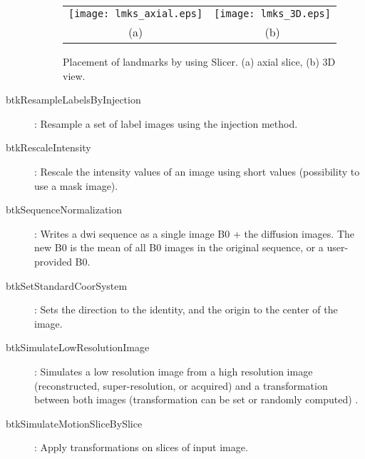 \begin{description}
\begin{figure}[t]
\centering
\begin{tabular}{cc}
\texttt{[image: lmks\_axial.eps]}&
\texttt{[image: lmks\_3D.eps]}\\
{(a)}&{(b)}\\
\end{tabular}
\caption{Placement of landmarks by using Slicer. (a) axial slice, (b) 3D view.}
\label{fig:landmarks}
\end{figure}

\item[btkResampleLabelsByInjection]: Resample a set of label images using the injection method.
\item[btkRescaleIntensity]: Rescale the intensity values of an image using short values (possibility to use a mask image).
\item[btkSequenceNormalization]: Writes a dwi sequence as a single image B0 + the diffusion images. The new B0 is the mean of all B0 images in the original sequence, or a user-provided B0.
\item[btkSetStandardCoorSystem]: Sets the direction to the identity, and the origin to the center of the image.
\item[btkSimulateLowResolutionImage]: Simulates a low resolution image from a high resolution image (reconstructed, super-resolution, or acquired) and a transformation between both images (transformation can be set or randomly computed)
.%
\item[btkSimulateMotionSliceBySlice]: Apply transformations on slices of input image.

\end{description}
